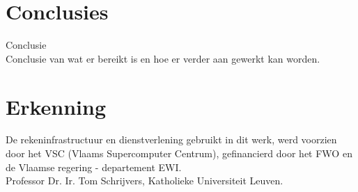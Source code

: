 \documentclass{article}
\begin{document}
\section{Conclusies}
Conclusie\cite{sortingNetworksSize2014}\\
Conclusie van wat er bereikt is en hoe er verder aan gewerkt kan worden.\cite{sortingNetworksTheEndGame}

\section*{Erkenning}
De rekeninfrastructuur en dienstverlening gebruikt in dit werk, werd voorzien door het VSC (Vlaams Supercomputer Centrum), gefinancierd door het FWO en de Vlaamse regering - departement EWI.\\
Professor Dr. Ir. Tom Schrijvers, Katholieke Universiteit Leuven.





\end{document}
